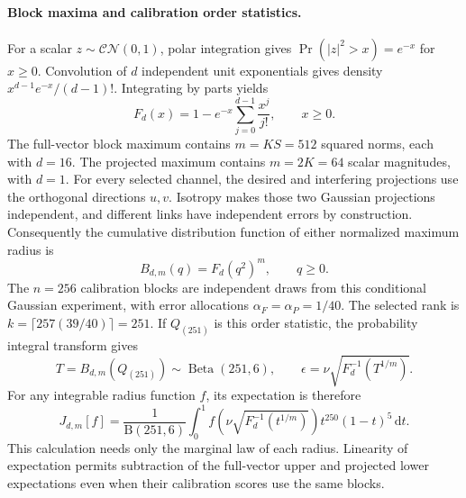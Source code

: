 \documentclass[10pt,letterpaper]{article}
\begin{document}
\paragraph{Block maxima and calibration order statistics.}
For a scalar \(z\sim\mathcal{CN}(0,1)\), polar integration gives
\(\Pr(|z|^2>x)=e^{-x}\) for \(x\geq0\). Convolution of \(d\) independent unit exponentials gives density \(x^{d-1}e^{-x}/(d-1)!\). Integrating by parts yields
\begin{equation}
 F_d(x)=1-e^{-x}\sum_{j=0}^{d-1}\frac{x^j}{j!},\qquad x\geq0.
 \label{supp:eq:erlang}
\end{equation}
The full-vector block maximum contains \(m=KS=512\) squared norms, each with \(d=16\). The projected maximum contains \(m=2K=64\) scalar magnitudes, with \(d=1\). For every selected channel, the desired and interfering projections use the orthogonal directions \(u,v\). Isotropy makes those two Gaussian projections independent, and different links have independent errors by construction. Consequently the cumulative distribution function of either normalized maximum radius is
\begin{equation}
 B_{d,m}(q)=F_d(q^2)^m,\qquad q\geq0.
 \label{supp:eq:blockcdf}
\end{equation}
The \(n=256\) calibration blocks are independent draws from this conditional Gaussian experiment, with error allocations \(\alpha_F=\alpha_P=1/40\). The selected rank is \(k=\lceil257(39/40)\rceil=251\). If \(Q_{(251)}\) is this order statistic, the probability integral transform gives
\begin{equation}
 T=B_{d,m}(Q_{(251)})\sim\operatorname{Beta}(251,6),\qquad
 \epsilon=\nu\sqrt{F_d^{-1}(T^{1/m})}.
 \label{supp:eq:betaradius}
\end{equation}
For any integrable radius function \(f\), its expectation is therefore
\begin{equation}
 J_{d,m}[f]=
 \frac{1}{\mathrm B(251,6)}
 \int_0^1
 f\!\left(\nu\sqrt{F_d^{-1}(t^{1/m})}\right)
 t^{250}(1-t)^5\,\mathrm dt.
 \label{supp:eq:gaussintegral}
\end{equation}
This calculation needs only the marginal law of each radius. Linearity of expectation permits subtraction of the full-vector upper and projected lower expectations even when their calibration scores use the same blocks.
\end{document}
